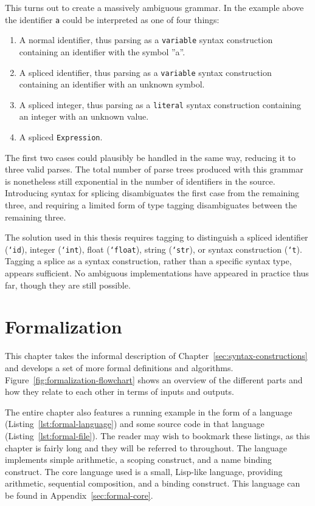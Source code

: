 \documentclass{kththesis}
\begin{document}
This turns out to create a massively ambiguous grammar. In the example above the identifier \texttt{a} could be interpreted as one of four things:
\begin{enumerate}
  \item A normal identifier, thus parsing as a \texttt{variable} syntax construction containing an identifier with the symbol ''a''.
  \item A spliced identifier, thus parsing as a \texttt{variable} syntax construction containing an identifier with an unknown symbol.
  \item A spliced integer, thus parsing as a \texttt{literal} syntax construction containing an integer with an unknown value.
  \item A spliced \texttt{Expression}.
\end{enumerate}

The first two cases could plausibly be handled in the same way, reducing it to three valid parses. The total number of parse trees produced with this grammar is nonetheless still exponential in the number of identifiers in the source. Introducing syntax for splicing disambiguates the first case from the remaining three, and requiring a limited form of type tagging disambiguates between the remaining three.

The solution used in this thesis requires tagging to distinguish a spliced identifier (\texttt{`id}), integer (\texttt{`int}), float (\texttt{`float}), string (\texttt{`str}), or syntax construction (\texttt{`t}). Tagging a splice as a syntax construction, rather than a specific syntax type, appears sufficient. No ambiguous implementations have appeared in practice thus far, though they are still possible.

\chapter{Formalization} \label{sec:formalization}

This chapter takes the informal description of Chapter~\ref{sec:syntax-constructions} and develops a set of more formal definitions and algorithms. Figure~\ref{fig:formalization-flowchart} shows an overview of the different parts and how they relate to each other in terms of inputs and outputs.

The entire chapter also features a running example in the form of a language (Listing~\ref{lst:formal-language}) and some source code in that language (Listing~\ref{lst:formal-file}). The reader may wish to bookmark these listings, as this chapter is fairly long and they will be referred to throughout. The language implements simple arithmetic, a scoping construct, and a name binding construct. The core language used is a small, Lisp-like language, providing arithmetic, sequential composition, and a binding construct. This language can be found in Appendix~\ref{sec:formal-core}.
\end{document}
